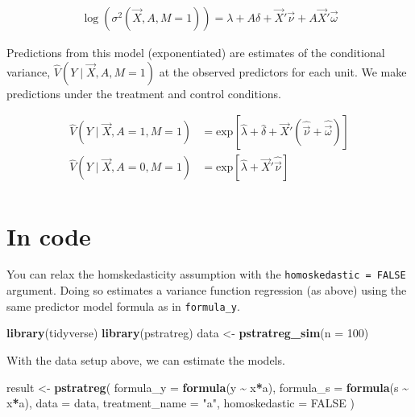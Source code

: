 \documentclass[
]{book}
\newenvironment{Shaded}{\begin{snugshade}}{\end{snugshade}}
\newcommand{\AttributeTok}[1]{\textcolor[rgb]{0.13,0.29,0.53}{#1}}
\newcommand{\ConstantTok}[1]{\textcolor[rgb]{0.56,0.35,0.01}{#1}}
\newcommand{\DecValTok}[1]{\textcolor[rgb]{0.00,0.00,0.81}{#1}}
\newcommand{\FunctionTok}[1]{\textcolor[rgb]{0.13,0.29,0.53}{\textbf{#1}}}
\newcommand{\NormalTok}[1]{#1}
\newcommand{\OtherTok}[1]{\textcolor[rgb]{0.56,0.35,0.01}{#1}}
\newcommand{\SpecialCharTok}[1]{\textcolor[rgb]{0.81,0.36,0.00}{\textbf{#1}}}
\newcommand{\StringTok}[1]{\textcolor[rgb]{0.31,0.60,0.02}{#1}}
\begin{document}
\[\begin{aligned}
\log(\sigma^2(\vec{X},A,M=1)) = \lambda + A\delta  + \vec{X}'\vec\nu + A\vec{X}'\vec\omega
\end{aligned}\]

Predictions from this model (exponentiated) are estimates of the conditional variance, \(\hat{V}(Y\mid \vec{X},A,M=1)\) at the observed predictors for each unit. We make predictions under the treatment and control conditions.

\[\begin{aligned}
\hat{V}(Y\mid \vec{X},A = 1,M=1) &= \text{exp}\left[\hat\lambda + \hat\delta  + \vec{X}'\left(\hat{\vec\nu} + \hat{\vec\omega}\right)\right] \\
\hat{V}(Y\mid \vec{X},A = 0,M=1) &= \text{exp}\left[\hat\lambda + \vec{X}'\hat{\vec\nu}\right] \\
\end{aligned}\]

\section{In code}\label{in-code}

You can relax the homskedasticity assumption with the \texttt{homoskedastic\ =\ FALSE} argument. Doing so estimates a variance function regression (as above) using the same predictor model formula as in \texttt{formula\_y}.

\begin{Shaded}
\begin{Highlighting}[]
\FunctionTok{library}\NormalTok{(tidyverse)}
\FunctionTok{library}\NormalTok{(pstratreg)}
\NormalTok{data }\OtherTok{\textless{}{-}} \FunctionTok{pstratreg\_sim}\NormalTok{(}\AttributeTok{n =} \DecValTok{100}\NormalTok{)}
\end{Highlighting}
\end{Shaded}

With the data setup above, we can estimate the models.

\begin{Shaded}
\begin{Highlighting}[]
\NormalTok{result }\OtherTok{\textless{}{-}} \FunctionTok{pstratreg}\NormalTok{(}
  \AttributeTok{formula\_y =} \FunctionTok{formula}\NormalTok{(y }\SpecialCharTok{\textasciitilde{}}\NormalTok{ x}\SpecialCharTok{*}\NormalTok{a),}
  \AttributeTok{formula\_s =} \FunctionTok{formula}\NormalTok{(s }\SpecialCharTok{\textasciitilde{}}\NormalTok{ x}\SpecialCharTok{*}\NormalTok{a),}
  \AttributeTok{data =}\NormalTok{ data,}
  \AttributeTok{treatment\_name =} \StringTok{"a"}\NormalTok{,}
  \AttributeTok{homoskedastic =} \ConstantTok{FALSE}
\NormalTok{)}
\end{Highlighting}
\end{Shaded}
\end{document}
